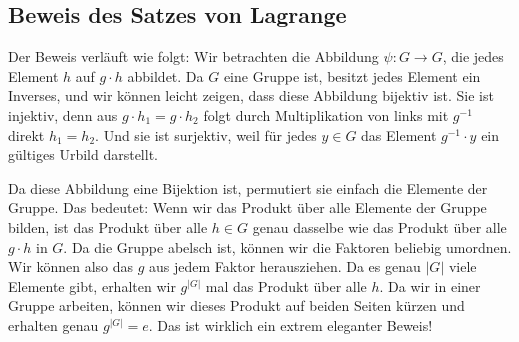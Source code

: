 \begin{math-stroke}
\end{math-stroke}

\subsection{Beweis des Satzes von Lagrange}

\begin{spoken-clean}[00:41:36 - 00:44:16]
Der Beweis verläuft wie folgt: Wir betrachten die Abbildung $\psi \colon G \to G$, die jedes Element $h$ auf $g \cdot h$ abbildet. Da $G$ eine Gruppe ist, besitzt jedes Element ein Inverses, und wir können leicht zeigen, dass diese Abbildung bijektiv ist. Sie ist injektiv, denn aus $g \cdot h_1 = g \cdot h_2$ folgt durch Multiplikation von links mit $g^{-1}$ direkt $h_1 = h_2$. Und sie ist surjektiv, weil für jedes $y \in G$ das Element $g^{-1} \cdot y$ ein gültiges Urbild darstellt.

Da diese Abbildung eine Bijektion ist, permutiert sie einfach die Elemente der Gruppe. Das bedeutet: Wenn wir das Produkt über alle Elemente der Gruppe bilden, ist das Produkt über alle $h \in G$ genau dasselbe wie das Produkt über alle $g \cdot h$ in $G$. Da die Gruppe abelsch ist, können wir die Faktoren beliebig umordnen. Wir können also das $g$ aus jedem Faktor herausziehen. Da es genau $|G|$ viele Elemente gibt, erhalten wir $g^{|G|}$ mal das Produkt über alle $h$. Da wir in einer Gruppe arbeiten, können wir dieses Produkt auf beiden Seiten kürzen und erhalten genau $g^{|G|} = e$. Das ist wirklich ein extrem eleganter Beweis!
\end{spoken-clean}

